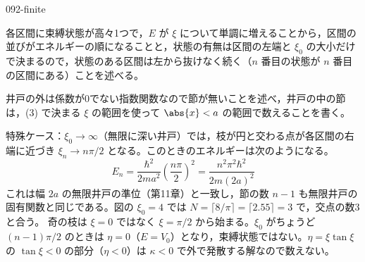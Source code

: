 \documentclass[uplatex,dvipdfmx,a4paper,11pt]{jsarticle}
\begin{document}
\begin{kaisetsu}{092-finite}
\begin{ronten}
  \item {} 各区間に束縛状態が高々1つで，$E$ が $\xi$ について単調に増えることから，区間の並びがエネルギーの順になることと，状態の有無は区間の左端と $\xi_{0}$ の大小だけで決まるので，状態のある区間は左から抜けなく続く（$n$ 番目の状態が $n$ 番目の区間にある）ことを述べる。
  \item {} 井戸の外は係数が0でない指数関数なので節が無いことを述べ，井戸の中の節は，(3) で決まる $\xi$ の範囲を使って $\abs{x}<a$ の範囲で数えることを書く。
\end{ronten}
\kenzan 特殊ケース：$\xi_{0}\to\infty$（無限に深い井戸）では，枝が円と交わる点が各区間の右端に近づき $\xi_{n}\to n\pi/2$ となる。このときのエネルギーは次のようになる。
\[ E_{n}=\frac{\hbar^{2}}{2ma^{2}}\left(\frac{n\pi}{2}\right)^{2}=\frac{n^{2}\pi^{2}\hbar^{2}}{2m(2a)^{2}} \]
これは幅 $2a$ の無限井戸の準位（第11章）と一致し，節の数 $n-1$ も無限井戸の固有関数と同じである。図の $\xi_{0}=4$ では $N=\lceil 8/\pi\rceil=\lceil 2.55\rceil=3$ で，交点の数3と合う。
\tsumazuki 奇の枝は $\xi=0$ ではなく $\xi=\pi/2$ から始まる。$\xi_{0}$ がちょうど $(n-1)\pi/2$ のときは $\eta=0$（$E=V_{0}$）となり，束縛状態ではない。$\eta=\xi\tan\xi$ の $\tan\xi<0$ の部分（$\eta<0$）は $\kappa<0$ で外で発散する解なので数えない。
\end{kaisetsu}
\end{document}
